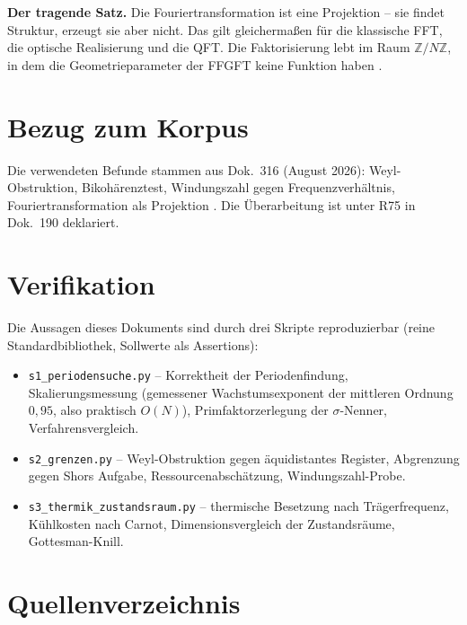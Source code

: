 \textbf{Der tragende Satz.} Die Fouriertransformation ist eine Projektion --
sie findet Struktur, erzeugt sie aber nicht. Das gilt gleichermaßen für die
klassische FFT, die optische Realisierung und die QFT. Die Faktorisierung lebt
im Raum $\mathbb{Z}/N\mathbb{Z}$, in dem die Geometrieparameter der FFGFT keine
Funktion haben \cite{Dok316}.

\section{Bezug zum Korpus}

Die verwendeten Befunde stammen aus Dok.~316 (August 2026): Weyl-Obstruktion,
Bikohärenztest, Windungszahl gegen Frequenzverhältnis, Fouriertransformation
als Projektion \cite{Dok316}. Die Überarbeitung ist unter R75 in Dok.~190
deklariert.

\section{Verifikation}

Die Aussagen dieses Dokuments sind durch drei Skripte reproduzierbar
(reine Standardbibliothek, Sollwerte als Assertions):

\begin{itemize}
  \item \texttt{s1\_periodensuche.py} -- Korrektheit der Periodenfindung,
    Skalierungsmessung (gemessener Wachstumsexponent der mittleren Ordnung
    $0{,}95$, also praktisch $O(N)$), Primfaktorzerlegung der
    $\sigma$-Nenner, Verfahrensvergleich.
  \item \texttt{s2\_grenzen.py} -- Weyl-Obstruktion gegen äquidistantes
    Register, Abgrenzung gegen Shors Aufgabe, Ressourcenabschätzung,
    Windungszahl-Probe.
  \item \texttt{s3\_thermik\_zustandsraum.py} -- thermische Besetzung nach
    Trägerfrequenz, Kühlkosten nach Carnot, Dimensionsvergleich der
    Zustandsräume, Gottesman-Knill.
\end{itemize}

\section*{Quellenverzeichnis}

